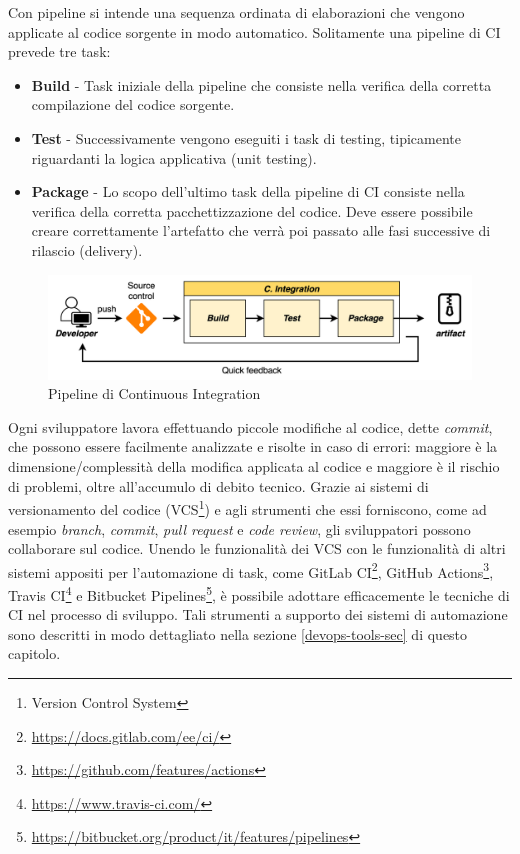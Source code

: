 Con pipeline si intende una sequenza ordinata di elaborazioni che vengono applicate al codice sorgente in modo automatico. Solitamente una pipeline di CI prevede tre task:

\begin{itemize}
    \item \textbf{Build} - Task iniziale della pipeline che consiste nella verifica della corretta compilazione del codice sorgente.
    \item \textbf{Test} - Successivamente vengono eseguiti i task di testing, tipicamente riguardanti la logica applicativa (unit testing).
    \item \textbf{Package} - Lo scopo dell'ultimo task della pipeline di CI consiste nella verifica della corretta pacchettizzazione del codice. Deve essere possibile creare correttamente l'artefatto che verrà poi passato alle fasi successive di rilascio (delivery).
\end{itemize}

\begin{figure}[H]
    \centering
    \includegraphics[width=1\textwidth]{img/ci-pipeline.png}
    \caption{Pipeline di Continuous Integration}
    \label{ci-pipeline}
\end{figure}

Ogni sviluppatore lavora effettuando piccole modifiche al codice, dette \textit{commit}, che possono essere facilmente analizzate e risolte in caso di errori: maggiore è la dimensione/complessità della modifica applicata al codice e maggiore è il rischio di problemi, oltre all'accumulo di debito tecnico. Grazie ai sistemi di versionamento del codice (VCS\footnote{Version Control System}) e agli strumenti che essi forniscono, come ad esempio \textit{branch}, \textit{commit}, \textit{pull request} e \textit{code review}, gli sviluppatori possono collaborare sul codice. Unendo le funzionalità dei VCS con le funzionalità di altri sistemi appositi per l'automazione di task, come GitLab CI\footnote{\href{https://docs.gitlab.com/ee/ci/}{https://docs.gitlab.com/ee/ci/}}, GitHub Actions\footnote{\href{https://github.com/features/actions}{https://github.com/features/actions}}, Travis CI\footnote{\href{https://www.travis-ci.com/}{https://www.travis-ci.com/}} e Bitbucket Pipelines\footnote{\href{https://bitbucket.org/product/it/features/pipelines}{https://bitbucket.org/product/it/features/pipelines}}, è possibile adottare efficacemente le tecniche di CI nel processo di sviluppo. Tali strumenti a supporto dei sistemi di automazione sono descritti in modo dettagliato nella sezione \ref{devops-tools-sec} di questo capitolo.

